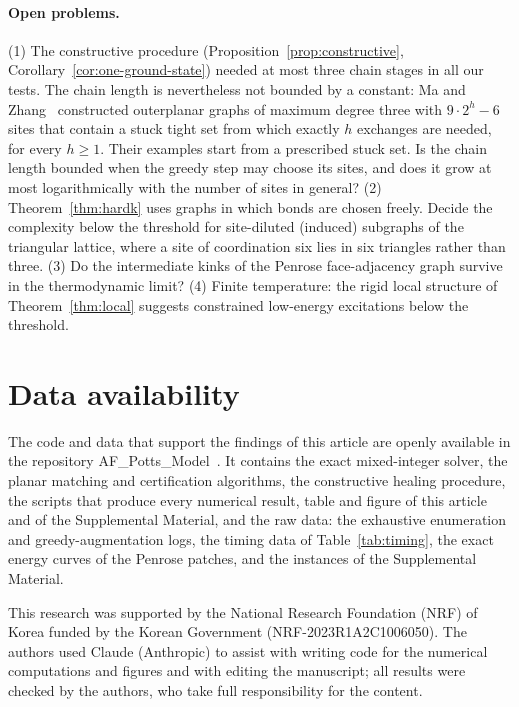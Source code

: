 \documentclass[aps,pre,twocolumn,floatfix,10pt]{revtex4-2}
\theoremstyle{definition}
\theoremstyle{remark}
\begin{document}
\paragraph*{Open problems.} (1) The constructive procedure (Proposition~\ref{prop:constructive},
Corollary~\ref{cor:one-ground-state}) needed at most three chain stages in all our tests. The
chain length is nevertheless not bounded by a constant: Ma and Zhang~\cite{MaZhang2026}
constructed outerplanar graphs of maximum degree three with $9\cdot2^h-6$ sites that contain a
stuck tight set from which exactly $h$ exchanges are needed, for every $h\ge1$. Their examples
start from a prescribed stuck set. Is the chain length bounded when the greedy step may choose its
sites, and does it grow at most logarithmically with the number of sites in general?
(2) Theorem~\ref{thm:hardk} uses graphs in which bonds are chosen freely. Decide the complexity
below the threshold for site-diluted (induced) subgraphs of the triangular lattice, where a site
of coordination six lies in six triangles rather than three.
(3) Do the intermediate kinks of the Penrose face-adjacency graph survive in the thermodynamic
limit? (4) Finite temperature: the rigid local structure of
Theorem~\ref{thm:local} suggests constrained low-energy excitations below the threshold.

\section*{Data availability}
The code and data that support the findings of this article are openly available in the
repository AF\_Potts\_Model~\cite{AFPottsRepo}. It contains the exact mixed-integer solver, the
planar matching and certification algorithms, the constructive healing procedure, the scripts that
produce every numerical result, table and figure of this article and of the Supplemental Material,
and the raw data: the exhaustive enumeration and greedy-augmentation logs, the timing data of
Table~\ref{tab:timing}, the exact energy curves of the Penrose patches, and the instances of the
Supplemental Material.

\begin{acknowledgments}
This research was supported by the National Research Foundation (NRF) of Korea funded by the
Korean Government (NRF-2023R1A2C1006050). The authors used Claude (Anthropic) to assist with
writing code for the numerical computations and figures and with editing the manuscript; all
results were checked by the authors, who take full responsibility for the content.
\end{acknowledgments}
\end{document}
